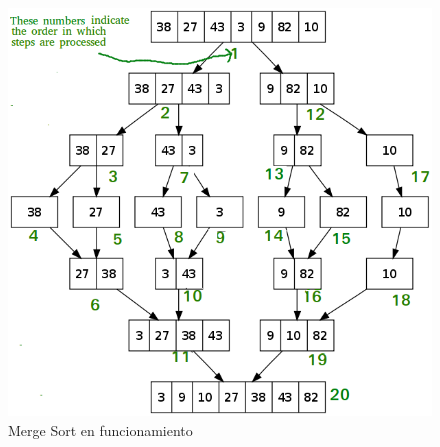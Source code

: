 \documentclass{article}
\begin{document}
    		        \begin{figure}[H]
        				\centering
        				\includegraphics[scale=0.40]{img/mergesort.png}
        				\caption{Merge Sort en funcionamiento}
        				\label{fig:merge_sort_img1}
        			\end{figure}
\end{document}
